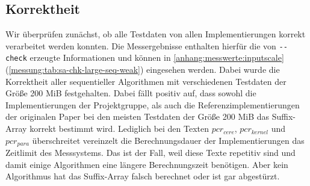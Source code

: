 \subsection{\sa Korrektheit}

Wir überprüfen zunächst, ob alle Testdaten von allen Implementierungen korrekt verarbeitet werden konnten. Die Messergebnisse enthalten hierfür die von \texttt{-{}-check} erzeugte Informationen und können in \cref{anhang:messwerte:inputscale} (\cref{messung:tab:sa-chk-large-seq-weak}) eingesehen werden. Dabei wurde die Korrektheit aller sequentieller Algorithmen mit verschiedenen Testdaten der Größe 200 MiB festgehalten. Dabei fällt positiv auf, dass sowohl die Implementierungen der Projektgruppe, als auch die Referenzimplementierungen der originalen Paper bei den meisten Testdaten der Größe 200 MiB das Suffix-Array korrekt bestimmt wird. Lediglich bei den Texten \texttt{$pcr_{cere}$}, \texttt{$pcr_{kernel}$} und \texttt{$pcr_{para}$} überschreitet vereinzelt die Berechnungsdauer der Implementierungen das Zeitlimit des Messsystems. Das ist der Fall, weil diese Texte repetitiv sind und damit einige Algorithmen eine längere Berechnungszeit benötigen. Aber kein Algorithmus hat das Suffix-Array falsch berechnet oder ist gar abgestürzt.